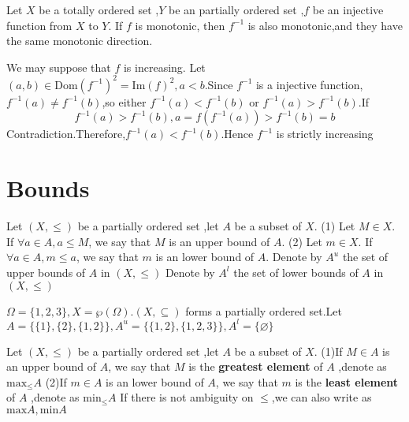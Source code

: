 \documentclass{book}
\numberwithin{equation}{section}
\begin{document}
\begin{propositionenv}
    Let $X$ be a totally ordered set ,$Y$ be an partially ordered set ,$f$ be an injective function from $X$ to $Y$. If $f$ is monotonic, then $f^{-1}$ is also monotonic,and they have the same monotonic direction.
\end{propositionenv}
\begin{proofenv}
    We may suppose that $f$ is increasing.
    Let $(a,b)\in \mathrm{Dom}(f^{-1})^2=\mathrm{Im}(f)^2,a<b$.Since $f^{-1}$ is a injective function,$f^{-1}(a)\not =f^{-1}(b)$,so either $f^{-1}(a)<f^{-1}(b)$ or $f^{-1}(a)>f^{-1}(b)$.If $$f^{-1}(a)>f^{-1}(b),a=f(f^{-1}(a))>f^{-1}(b)=b$$Contradiction.Therefore,$f^{-1}(a)<f^{-1}(b)$.Hence $f^{-1}$ is strictly increasing
\end{proofenv}
\section{Bounds}
\begin{definitionenv}
    Let $(X,\le)$ be a partially ordered set ,let $A$ be a subset of $X$.
    \newline
    (1) Let $M\in X$. If $\forall a \in A ,a\le M$, we say that $M$ is an upper bound of $A$. 
    \newline
    (2) Let $m\in X$. If $\forall a \in A ,m\le a$, we say that $m$ is an lower bound of $A$. 
    \newline
    Denote by $A^u$ the set of upper bounds of $A$ in $(X,\le)$
    \newline
     Denote by $A^l$ the set of lower bounds of $A$ in $(X,\le)$

\end{definitionenv}
\begin{exampleenv}
    $\Omega=\{1,2,3\},X=\wp (\Omega).(X,\subseteq)$ forms a partially ordered set.Let $A=\{\{1\},\{2\},\{1,2\}\},A^u=\{\{1,2\},\{1,2,3\}\},A^l=\{\varnothing\}$
\end{exampleenv}
\begin{definitionenv}
    Let $(X,\le)$ be a partially ordered set ,let $A$ be a subset of $X$.
    \newline
    (1)If $M \in A$ is an upper bound of $A$, we say that $M$ is the \textbf{greatest element} of $A$ ,denote as $\mathrm{max}_\le A$
    \newline
    (2)If $m \in A$ is an lower bound of $A$, we say that $m$ is the \textbf{least element} of $A$ ,denote as $\mathrm{min}_\le A$
    \newline
    If there is not ambiguity on $\le$,we can also write as $\mathrm{max}A,\mathrm{min}A$
\end{definitionenv}
\end{document}
